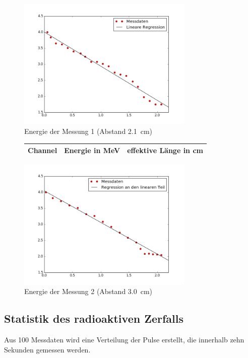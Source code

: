  
  \begin{figure}[h!]
  	\centering
  	\includegraphics[width=0.75\textwidth]{build/energie1.png}
  	\caption{Energie der Messung 1 (Abstand \SI{2,1}{\centi\meter})}
  	\label{fig:energie1}
  \end{figure}
  
  \clearpage
  
  
    \begin{figure}[h!]
    	\centering
    	\begin{tabular}{c|c|c}
    		Channel & Energie in \si{\mega\electronvolt} & effektive Länge in \si{cm} \\
    		\hline
    		
    	\end{tabular}
    	\label{tab:energie2}
    \end{figure}
    
   \begin{figure}[h!]
   	\centering
   	\includegraphics[width=0.75\textwidth]{build/energie2.png}
   	\caption{Energie der Messung 2 (Abstand \SI{3,0}{\centi\meter})}
   	\label{fig:energie2}
   \end{figure}
   
   
\clearpage


\subsection{Statistik des radioaktiven Zerfalls}
Aus 100 Messdaten wird eine Verteilung der Pulse erstellt, die innerhalb zehn Sekunden gemessen werden.
 



